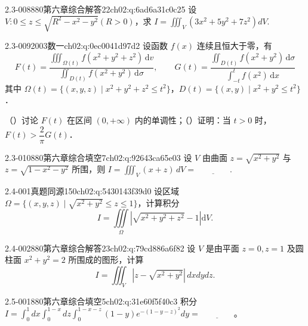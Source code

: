 \begin{q}{2.3-008}{880第六章综合解答22}{ch02:q:6ad6a31c0c25}
设 $V:0\le z\le \sqrt{R^2-x^2-y^2}(R>0)$，求 $\displaystyle I=\iiint_V (3x^2+5y^2+7z^2)dV$.
\end{q}

\begin{q}{2.3-009}{2003数一}{ch02:q:0ec0041d97d2}
设函数 $f(x)$ 连续且恒大于零，有
\[
F(t)=\frac{\iiint_{\Omega(t)} f(x^{2}+y^{2}+z^{2})\,\mathrm{d}v}{\iint_{D(t)} f(x^{2}+y^{2})\,\mathrm{d}\sigma},\qquad G(t)=\frac{\iint_{D(t)} f(x^{2}+y^{2})\,\mathrm{d}\sigma}{\int_{-t}^{t} f(x^{2})\,\mathrm{d}x}
\]
其中 $\Omega(t)=\{(x,y,z)\mid x^{2}+y^{2}+z^{2}\leqslant t^{2}\}$，$D(t)=\{(x,y)\mid x^{2}+y^{2}\leqslant t^{2}\}$．

（）讨论 $F(t)$ 在区间 $(0,+\infty)$ 内的单调性；（）证明：当 $t>0$ 时，$F(t)>\dfrac{2}{\pi}G(t)$．
\end{q}

\begin{q}{2.3-010}{880第六章综合填空7}{ch02:q:92643ca65e03}
设 $V$ 由曲面 $z=\sqrt{x^2+y^2}$ 与 $z=\sqrt{1-x^2-y^2}$ 所围，则
$\displaystyle I=\iiint_V (x+z)\,dV=\underline{\hspace{4em}}.$
\end{q}

\par\addvspace{2.4ex}\noindent
\begin{minipage}{\linewidth}

\begin{q}{2.4-001}{真题同源150}{ch02:q:5430143f39d0}
设区域 $\Omega=\{(x,y,z)\mid \sqrt{x^2+y^2}\le z\le 1\}$，计算积分 \[ I=\iiint\limits_{\Omega}\left|\sqrt{x^2+y^2+z^2}-1\right|\mathrm{d}V. \]
\end{q}
\end{minipage}


\begin{q}{2.4-002}{880第六章综合解答23}{ch02:q:79cd886a6f82}
设 $V$ 是由平面 $z=0,z=1$ 及圆柱面 $x^2+y^2=2$ 所围成的图形，计算 \[ I=\iiint_V \left|z-\sqrt{x^2+y^2}\right|\,dxdydz. \]
\end{q}

\par\addvspace{2.4ex}\noindent
\begin{minipage}{\linewidth}

\begin{q}{2.5-001}{880第六章综合填空5}{ch02:q:31e60f5f40c3}
积分 $\displaystyle I=\int_0^1 dx \int_0^{1-x} dz \int_0^{1-x-z} (1-y)e^{-(1-y-z)^2} dy=\underline{\hspace{4em}}$。
\end{q}
\end{minipage}


